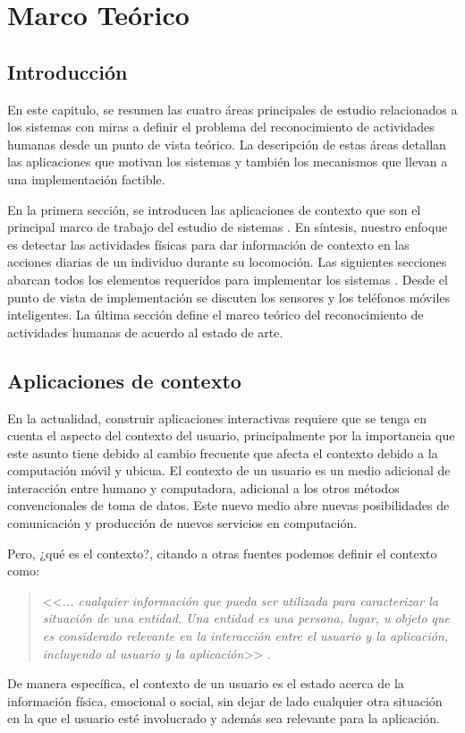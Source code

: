 
\chapter{Marco Teórico}

\label{chap2:marco-teorico}

\section{Introducción}

\label{sec21:introduccion}En este capitulo, se resumen las cuatro
áreas principales de estudio relacionados a los sistemas 
con miras a definir el problema del reconocimiento de actividades
humanas desde un punto de vista teórico. La descripción de estas áreas
detallan las aplicaciones que motivan los sistemas  y también
los mecanismos que llevan a una implementación factible. 

En la primera sección, se introducen las aplicaciones de contexto
que son el principal marco de trabajo del estudio de sistemas .
En síntesis, nuestro enfoque es detectar las actividades físicas para
dar información de contexto en las acciones diarias de un individuo
durante su locomoción. Las siguientes secciones abarcan todos los
elementos requeridos para implementar los sistemas . Desde
el punto de vista de implementación se discuten los sensores y los
teléfonos móviles inteligentes. La última sección define el marco
teórico del reconocimiento de actividades humanas de acuerdo al estado
de arte.

\section{Aplicaciones de contexto}

\label{sec22:contexto}En la actualidad, construir aplicaciones interactivas
requiere que se tenga en cuenta el aspecto del contexto del usuario,
principalmente por la importancia que este asunto tiene debido al
cambio frecuente que afecta el contexto debido a la computación móvil
y ubicua. El contexto de un usuario es un medio adicional de interacción
entre humano y computadora, adicional a los otros métodos convencionales
de toma de datos. Este nuevo medio abre nuevas posibilidades de comunicación
y producción de nuevos servicios en computación. 

Pero, ¿qué es el contexto?, citando a otras fuentes podemos definir
el contexto como: 
\begin{quotation}
<<\emph{... cualquier información que pueda ser utilizada para caracterizar
la situación de una entidad. Una entidad es una persona, lugar, u
objeto que es considerado relevante en la interacción entre el usuario
y la aplicación, incluyendo al usuario y la aplicación}>> \cite{Dey2000}. 
\end{quotation}
De manera específica, el contexto de un usuario es el estado acerca
de la información física, emocional o social, sin dejar de lado cualquier
otra situación en la que el usuario esté involucrado y además sea
relevante para la aplicación.

